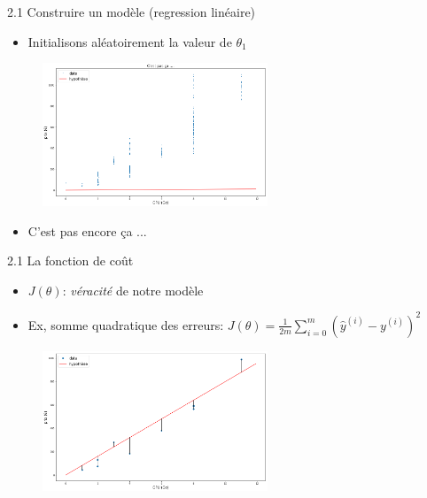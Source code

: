 \begin{frame}{2.1 Construire un modèle (regression linéaire)}
  \begin{itemize}
  \item Initialisons aléatoirement la valeur de $\theta_{1}$
  \end{itemize}
  \vspace{-0.5cm}
  \begin{figure}
    \includegraphics[width=0.6\textwidth]{fig/model.png}
  \end{figure}
  \vspace{-0.5cm}
  \begin{itemize}
  \item C'est pas encore ça ...
  \end{itemize}
\end{frame}

\begin{frame}{2.1 La fonction de coût}
  \begin{itemize}
  \item  $J(\theta)$: \textit{véracité} de notre modèle
  \item Ex, somme quadratique des erreurs: $J(\theta) = \frac{1}{2m} \displaystyle\sum_{i=0}^{m}(\hat{y}^{(i)} - y^{(i)})^{2}$
  \end{itemize}
  \begin{figure}
    \includegraphics[width=0.6\textwidth]{fig/modelEstimation.png}
  \end{figure}  
\end{frame}

